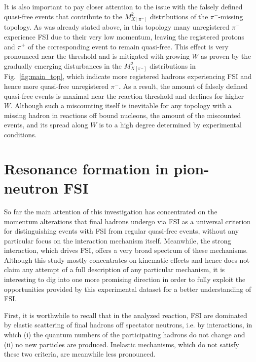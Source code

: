 It is also important to pay closer attention to the issue with the falsely defined quasi-free events that contribute to the $M^{2}_{X[\pi^{-}]}$ distributions of the $\pi^{-}$-missing topology. As was already stated above, in this topology many unregistered $\pi^{-}$ experience FSI due to their very low momentum, leaving the registered protons and $\pi^{+}$ of the corresponding event to remain quasi-free. This effect is very pronounced near the threshold and is mitigated with growing $W$ as proven by the gradually emerging disturbances in the $M^{2}_{X[\pi^{-}]}$ distributions in Fig.~\ref{fig:main_top}, which indicate more registered hadrons experiencing FSI and hence more quasi-free unregistered $\pi^{-}$. As a result, the amount of falsely defined quasi-free events is maximal near the reaction threshold and declines for higher $W$. Although such a miscounting itself is inevitable for any topology with a missing hadron in reactions off bound nucleons, the amount of the miscounted events, and its spread along $W$ is to a high degree determined by experimental conditions.  


\section{Resonance formation in pion-neutron FSI}
\label{Sect:resonance_fsi}

So far the main attention of this investigation has concentrated on the momentum alterations that final hadrons undergo via FSI as a universal criterion for distinguishing events with FSI from regular quasi-free events, without any particular focus on the interaction mechanism itself. Meanwhile, the strong interaction, which drives FSI, offers a very broad spectrum of these mechanisms. Although this study mostly concentrates on kinematic effects and hence does not claim any attempt of a full description of any particular mechanism, it is interesting to dig into one more promising direction in order to fully exploit the opportunities provided by this experimental dataset for a better understanding of FSI.

First, it is worthwhile to recall that in the analyzed reaction, FSI are dominated by elastic scattering of final hadrons off spectator neutrons, i.e. by interactions, in which (i) the quantum numbers of the participating hadrons do not change and (ii) no new particles are produced. Inelastic mechanisms, which do not satisfy these two criteria, are meanwhile less pronounced. 




